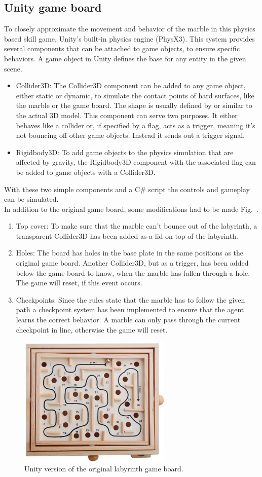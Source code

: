 \subsection{Unity game board}\label{subsec:unity-game-board}
To closely approximate the movement and behavior of the marble in this physics based skill game,
Unity's built-in physics engine (PhysX3).
This system provides several components that can be attached to game objects, to ensure specific behaviors.
A game object in Unity defines the base for any entity in the given scene.
\begin{itemize}
    \item{Collider3D}: The Collider3D component can be added to any game object, either static or dynamic, to simulate the contact points of hard surfaces, like the marble or the game board.
    The shape is usually defined by or similar to the actual 3D model.
    This component can serve two purposes.
    It either behaves like a collider or, if specified by a flag, acts as a trigger, meaning it's not bouncing off other game objects.
    Instead it sends out a trigger signal.
    \item{Rigidbody3D}: To add game objects to the physics simulation that are affected by gravity, the Rigidbody3D component with the associated flag can be added to game objects with a Collider3D.
\end{itemize}
With these two simple components and a C\# script the controls and gameplay can be simulated.\\
In addition to the original game board, some modifications had to be made Fig.~\cite{fig:unity_board}.
\begin{enumerate}
    \item{Top cover}: To make sure that the marble can't bounce out of the labyrinth, a transparent Collider3D has been
    added as a lid on top of the labyrinth.
    \item{Holes}: The board has holes in the base plate in the same positions as the original game board.
    Another Collider3D, but as a trigger, has been added below the game board to know, when the marble has fallen through a hole.
    The game will reset, if this event occurs.
    \item{Checkpoints}: Since the rules state that the marble has to follow the given path a checkpoint system has been implemented to ensure that the agent learns the correct behavior.
    A marble can only pass through the current checkpoint in line, otherwise the game will reset.
\end{enumerate}

\begin{figure}[h]
    \centering
    \includegraphics[width=0.65\textwidth]{images/wooden_game_board}
    \caption{Unity version of the original labyrinth game board.}
    \label{fig:unity_board}
\end{figure}